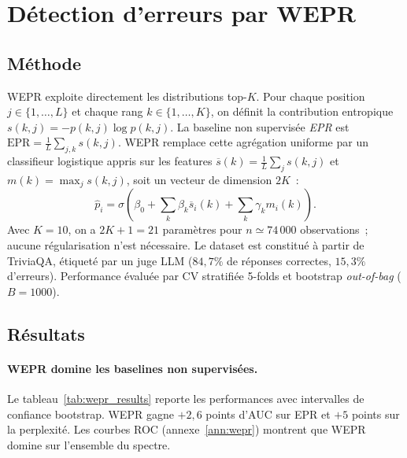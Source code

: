 \documentclass[12pt,a4paper]{article}
\begin{document}

\section{Détection d'erreurs par WEPR}
\label{sec:wepr}

\subsection{Méthode}

WEPR \citep{moslonka2026} exploite directement les distributions top-$K$. Pour chaque position $j \in \{1,\ldots,L\}$ et chaque rang $k \in \{1,\ldots,K\}$, on définit la contribution entropique $s(k,j) = -p(k,j)\log p(k,j)$. La baseline non supervisée \emph{EPR} est $\mathrm{EPR} = \tfrac{1}{L}\sum_{j,k} s(k,j)$. WEPR remplace cette agrégation uniforme par un classifieur logistique appris sur les features $\overline{s}(k) = \tfrac{1}{L}\sum_j s(k,j)$ et $m(k) = \max_j s(k,j)$, soit un vecteur de dimension $2K$~:
\begin{equation}
\hat{p}_i = \sigma\left(\beta_0 + \sum_k \beta_k \overline{s}_i(k) + \sum_k \gamma_k m_i(k)\right).
\end{equation}
Avec $K = 10$, on a $2K + 1 = 21$ paramètres pour $n \simeq 74\,000$ observations~; aucune régularisation n'est nécessaire. Le dataset est constitué à partir de TriviaQA, étiqueté par un juge LLM ($84{,}7\%$ de réponses correctes, $15{,}3\%$ d'erreurs). Performance évaluée par CV stratifiée 5-folds et bootstrap \emph{out-of-bag} ($B=1000$).

\subsection{Résultats}

\paragraph{WEPR domine les baselines non supervisées.}
Le tableau~\ref{tab:wepr_results} reporte les performances avec intervalles de confiance bootstrap. WEPR gagne $+2{,}6$ points d'AUC sur EPR et $+5$ points sur la perplexité. Les courbes ROC (annexe~\ref{ann:wepr}) montrent que WEPR domine sur l'ensemble du spectre.
\end{document}
